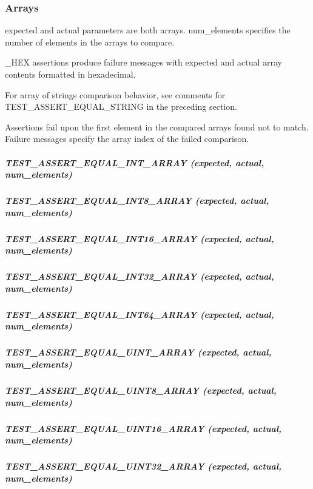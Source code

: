 \subsubsection*{Arrays}

{\ttfamily expected} and {\ttfamily actual} parameters are both arrays. {\ttfamily num\+\_\+elements} specifies the number of elements in the arrays to compare.

{\ttfamily \+\_\+\+H\+EX} assertions produce failure messages with expected and actual array contents formatted in hexadecimal.

For array of strings comparison behavior, see comments for {\ttfamily T\+E\+S\+T\+\_\+\+A\+S\+S\+E\+R\+T\+\_\+\+E\+Q\+U\+A\+L\+\_\+\+S\+T\+R\+I\+NG} in the preceding section.

Assertions fail upon the first element in the compared arrays found not to match. Failure messages specify the array index of the failed comparison.

\subparagraph*{{\ttfamily T\+E\+S\+T\+\_\+\+A\+S\+S\+E\+R\+T\+\_\+\+E\+Q\+U\+A\+L\+\_\+\+I\+N\+T\+\_\+\+A\+R\+R\+AY (expected, actual, num\+\_\+elements)}}

\subparagraph*{{\ttfamily T\+E\+S\+T\+\_\+\+A\+S\+S\+E\+R\+T\+\_\+\+E\+Q\+U\+A\+L\+\_\+\+I\+N\+T8\+\_\+\+A\+R\+R\+AY (expected, actual, num\+\_\+elements)}}

\subparagraph*{{\ttfamily T\+E\+S\+T\+\_\+\+A\+S\+S\+E\+R\+T\+\_\+\+E\+Q\+U\+A\+L\+\_\+\+I\+N\+T16\+\_\+\+A\+R\+R\+AY (expected, actual, num\+\_\+elements)}}

\subparagraph*{{\ttfamily T\+E\+S\+T\+\_\+\+A\+S\+S\+E\+R\+T\+\_\+\+E\+Q\+U\+A\+L\+\_\+\+I\+N\+T32\+\_\+\+A\+R\+R\+AY (expected, actual, num\+\_\+elements)}}

\subparagraph*{{\ttfamily T\+E\+S\+T\+\_\+\+A\+S\+S\+E\+R\+T\+\_\+\+E\+Q\+U\+A\+L\+\_\+\+I\+N\+T64\+\_\+\+A\+R\+R\+AY (expected, actual, num\+\_\+elements)}}

\subparagraph*{{\ttfamily T\+E\+S\+T\+\_\+\+A\+S\+S\+E\+R\+T\+\_\+\+E\+Q\+U\+A\+L\+\_\+\+U\+I\+N\+T\+\_\+\+A\+R\+R\+AY (expected, actual, num\+\_\+elements)}}

\subparagraph*{{\ttfamily T\+E\+S\+T\+\_\+\+A\+S\+S\+E\+R\+T\+\_\+\+E\+Q\+U\+A\+L\+\_\+\+U\+I\+N\+T8\+\_\+\+A\+R\+R\+AY (expected, actual, num\+\_\+elements)}}

\subparagraph*{{\ttfamily T\+E\+S\+T\+\_\+\+A\+S\+S\+E\+R\+T\+\_\+\+E\+Q\+U\+A\+L\+\_\+\+U\+I\+N\+T16\+\_\+\+A\+R\+R\+AY (expected, actual, num\+\_\+elements)}}

\subparagraph*{{\ttfamily T\+E\+S\+T\+\_\+\+A\+S\+S\+E\+R\+T\+\_\+\+E\+Q\+U\+A\+L\+\_\+\+U\+I\+N\+T32\+\_\+\+A\+R\+R\+AY (expected, actual, num\+\_\+elements)}}


